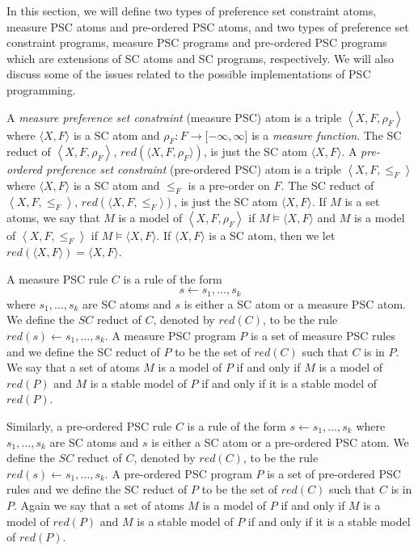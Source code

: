 \documentclass[letterpaper]{article}\usepackage{aaai}
\begin{document}
In this section, we will define two types of preference set constraint atoms,
measure PSC atoms and pre-ordered PSC atoms, and two types of preference set
constraint programs, measure PSC programs and pre-ordered PSC programs which
are extensions of SC atoms and SC programs, respectively. We will also discuss
some of the issues related to the possible implementations of PSC programming.

A \emph{measure preference set constraint} (measure PSC) atom is a triple
$\left\langle X,F,\rho_{F}\right\rangle $ where $\langle X,F\rangle$ is a SC
atom and $\rho_{F}:F\rightarrow\lbrack-\infty,\infty]$ is a \emph{measure
function}. The SC reduct of $\left\langle X,F,\rho_{F}\right\rangle $,
$red(\langle X,F,\rho_{F}\rangle)$, is just the SC atom $\langle X,F\rangle$.
A \emph{pre-ordered preference set constraint} (pre-ordered PSC) atom is a
triple $\left\langle X,F,\leq_{F}\right\rangle $ where $\langle X,F\rangle$ is
a SC atom and $\leq_{F}$ is a pre-order on $F$. The SC reduct of $\left\langle
X,F,\leq_{F}\right\rangle $, $red(\langle X,F,\leq_{F}\rangle)$, is just the
SC atom $\langle X,F\rangle$. If $M$ is a set atoms, we say that $M$ is a
model of $\left\langle X,F,\rho_{F}\right\rangle $ if $M\models\langle
X,F\rangle$ and $M$ is a model of $\left\langle X,F,\leq_{F}\right\rangle $ if
$M\models\langle X,F\rangle$. If $\langle X,F\rangle$ is a SC atom, then we
let $red(\langle X,F\rangle)=\langle X,F\rangle$.

A measure PSC rule $C$ is a rule of the form
\[
s\leftarrow s_{1},\ldots,s_{k}\]
where $s_{1},\ldots,s_{k}$ are SC atoms and $s$ is either a SC atom or a
measure PSC atom. We define the $SC$ reduct of $C$, denoted by $red(C)$, to be
the rule $red(s)\leftarrow s_{1},\ldots,s_{k}$. A measure PSC program $P$ is a
set of measure PSC rules and we define the SC reduct of $P$ to be the set of
$red(C)$ such that $C$ is in $P$. We say that a set of atoms $M$ is a model of
$P$ if and only if $M$ is a model of $red(P)$ and $M$ is a stable model of $P$
if and only if it is a stable model of $red(P)$.

Similarly, a pre-ordered PSC rule $C$ is a rule of the form $s\leftarrow
s_{1},\ldots,s_{k}$ where $s_{1},\ldots,s_{k}$ are SC atoms and $s$ is either
a SC atom or a pre-ordered PSC atom. We define the $SC$ reduct of $C$, denoted
by $red(C)$, to be the rule $red(s)\leftarrow s_{1},\ldots,s_{k}$. A
pre-ordered PSC program $P$ is a set of pre-ordered PSC rules and we define
the SC reduct of $P$ to be the set of $red(C)$ such that $C$ is in $P$. Again
we say that a set of atoms $M$ is a model of $P$ if and only if $M$ is a model
of $red(P)$ and $M$ is a stable model of $P$ if and only if it is a stable
model of $red(P)$.
\end{document}
